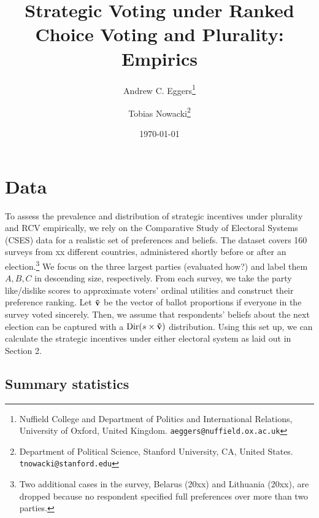 \documentclass[11pt, letter]{article}
\begin{document}
\author{Andrew C. Eggers\thanks{Nuffield College and Department of Politics and International Relations, University of Oxford, United Kingdom. \texttt{aeggers@nuffield.ox.ac.uk}}
\and
Tobias Nowacki\thanks{Department of Political Science, Stanford University, CA, United States. \texttt{tnowacki@stanford.edu}}}
\date{\today}
\title{Strategic Voting under Ranked Choice Voting and Plurality: Empirics}

\maketitle

\onehalfspacing %

\section{Data}

To assess the prevalence and distribution of strategic incentives under plurality and RCV empirically, we rely on the Comparative Study of Electoral Systems (CSES) data for a realistic set of preferences and beliefs. The dataset covers 160 surveys from xx different countries, administered shortly before or after an election.\footnote{Two additional cases in the survey, Belarus (20xx) and Lithuania (20xx), are dropped because no respondent specified full preferences over more than two parties.} We focus on the three largest parties (evaluated how?) and label them $A, B, C$ in descending size, respectively. From each survey, we take the party like/dislike scores to approximate voters' ordinal utilities and construct their preference ranking. Let $\bf \tilde{v}$ be the vector of ballot proportions if everyone in the survey voted sincerely. Then, we assume that respondents' beliefs about the next election can be captured with a $\text{Dir}(s \times \bf \tilde{v})$ distribution. Using this set up, we can calculate the strategic incentives under either electoral system as laid out in Section 2.

\subsection{Summary statistics}
\end{document}
